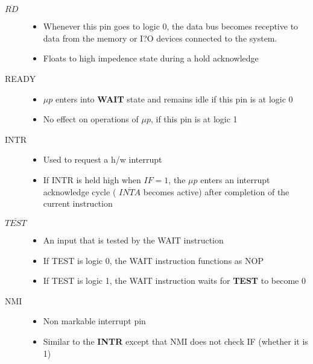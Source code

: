 \documentclass{article}
\begin{document}
\begin{description}
    \item[$\overline{RD}$]
    \begin{itemize}
        \item  Whenever this pin goes to logic 0, the data bus becomes receptive to data from the memory or I?O devices
            connected to the system.
        \item Floats to high impedence state during a hold acknowledge
    \end{itemize}

    \item[READY]
    \begin{itemize}
        \item $\mu p$ enters into \textbf{WAIT} state and remains idle if this pin is at logic 0
        \item No effect on operations of $\mu p$, if this pin is at logic 1
    \end{itemize}


    \item[INTR]
    \begin{itemize}
        \item  Used to request a h/w interrupt
        \item  If INTR is held high when $IF = 1$, the $\mu p$ enters an interrupt acknowledge cycle
        ( $\overline{INTA}$ becomes active) after completion of the current instruction
    \end{itemize}

    \item[$\overline{TEST}$]
    \begin{itemize}
        \item  An input that is tested by the WAIT instruction
        \item  If TEST is logic 0, the WAIT instruction functions as NOP
        \item If TEST is logic 1, the WAIT instruction waits for \textbf{TEST} to become 0
    \end{itemize}

   \item[NMI]
   \begin{itemize}
       \item Non markable interrupt pin
       \item Similar to the \textbf{INTR} except that NMI does not check IF (whether it is 1)

   \end{itemize}


\end{description}
\end{document}
